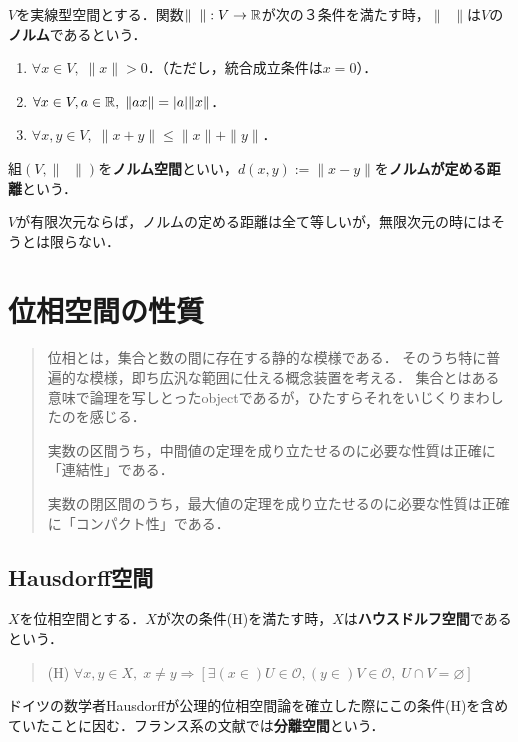 \documentclass[uplatex, 12pt, dvipdfmx]{jsreport}
\begin{document}
\begin{definition}
    $V$を実線型空間とする．関数$\|\;\;\|:V\to\mathbb{R}$が次の３条件を満たす時，$\|\;\;\|$は$V$の\textbf{ノルム}であるという．
    \begin{enumerate}
        \item $\forall x\in V,\; \|x\|>0$．（ただし，統合成立条件は$x=0$）．
        \item $\forall x\in V,a\in\mathbb{R},\; \|ax\|=|a|\|x\|$．
        \item $\forall x,y\in V,\;\|x+y\|\le\|x\|+\|y\|$．
    \end{enumerate}
    組$(V,\|\;\;\|)$を\textbf{ノルム空間}といい，$d(x,y):=\|x-y\|$を\textbf{ノルムが定める距離}という．
\end{definition}
\begin{remark}
    $V$が有限次元ならば，ノルムの定める距離は全て等しいが，無限次元の時にはそうとは限らない．
\end{remark}

\chapter{位相空間の性質}

\begin{quotation}
    位相とは，集合と数の間に存在する静的な模様である．
    そのうち特に普遍的な模様，即ち広汎な範囲に仕える概念装置を考える．
    集合とはある意味で論理を写しとったobjectであるが，ひたすらそれをいじくりまわしたのを感じる．

    実数の区間うち，中間値の定理を成り立たせるのに必要な性質は正確に「連結性」である．

    実数の閉区間のうち，最大値の定理を成り立たせるのに必要な性質は正確に「コンパクト性」である．
\end{quotation}

\section{Hausdorff空間}

\begin{definition}[Hausdorff]
    $X$を位相空間とする．$X$が次の条件(H)を満たす時，$X$は\textbf{ハウスドルフ空間}であるという．
    \begin{quote}
        (H) $\forall x,y\in X,\; x\ne y\Rightarrow [\exists (x\in )U\in\mathcal{O}, (y\in)V\in\mathcal{O},\;U\cap V=\varnothing]$
    \end{quote}
\end{definition}
\begin{remark}
    ドイツの数学者Hausdorffが公理的位相空間論を確立した際にこの条件(H)を含めていたことに因む．フランス系の文献では\textbf{分離空間}という．
\end{remark}
\end{document}
